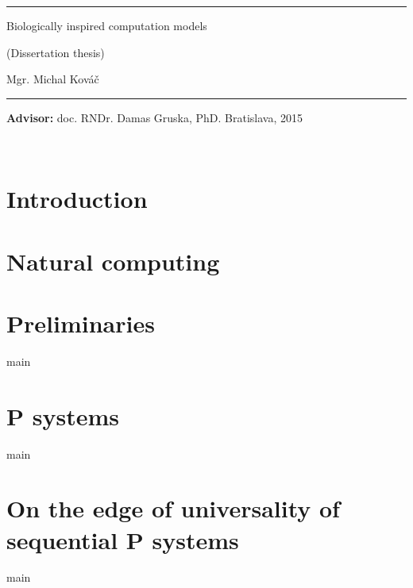 \documentclass[a4paper,12pt,oneside,openany]{book}
\def\mftitlea{Biologically inspired computation models}
\def\mfthesistype{Dissertation thesis}
\def\mfauthor{Mgr. Michal Kováč}
\def\mfadvisor{doc. RNDr. Damas Gruska, PhD.}
\def\mfplacedate{Bratislava, 2015}
\begin{document}
\vfill
\begin{center}
\begin{minipage}{0.8\textwidth}
\hrule
\bigskip\bigskip
\centerline{\LARGE\sc\mftitlea}
\smallskip
\centerline{(\mfthesistype)}
\bigskip
\bigskip
\centerline{\large\sc\mfauthor}
\bigskip\bigskip
\hrule
\end{minipage}
\end{center}
\vfill
{\bf Advisor:} \mfadvisor
\hfill\mfplacedate
\eject
\eject

\thispagestyle{empty}
{~}\vspace{12cm}




\tableofcontents{}
\listoffigures{}
\listofalgorithms{}

\mainmatter

\chapter*{Introduction} %
\label{cha:introduction}



\chapter{Natural computing} %
\label{cha:natural_computing}



\chapter{Preliminaries} %
\label{cha:preliminaries}
{main}


\chapter{P systems} %
\label{cha:p_systems}
{main}


\chapter{On the edge of universality of sequential P systems} %
\label{cha:on_the_edge_of_universality_of_sequential_p_systems}
{main}
\end{document}
